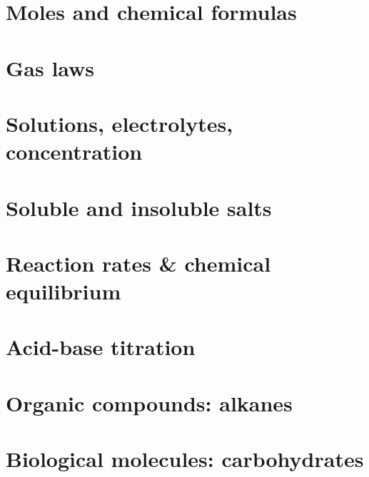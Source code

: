    \newpage\section{ Moles and chemical formulas   }\clearpage\mbox{}\clearpage 
   \newpage\section{  Gas laws  }\clearpage\mbox{}\clearpage 


 \newpage\section{  Solutions, electrolytes, concentration   }\clearpage\mbox{}\clearpage 

 \newpage\section{  Soluble and insoluble salts  }\clearpage\mbox{}\clearpage 
  \newpage\section{  Reaction rates \&  chemical equilibrium   }\clearpage\mbox{}\clearpage 
  \newpage\section{  Acid-base titration   }\clearpage\mbox{}\clearpage 
  \newpage\section{  Organic compounds: alkanes   }\clearpage\mbox{}\clearpage 
  \newpage\section{  Biological molecules: carbohydrates  }\clearpage\mbox{}\clearpage 

 



\clearpage\mbox{}\clearpage
\clearpage\mbox{}\clearpage
\clearpage\mbox{}\clearpage
\newpage
\clearpage\mbox{}\clearpage






